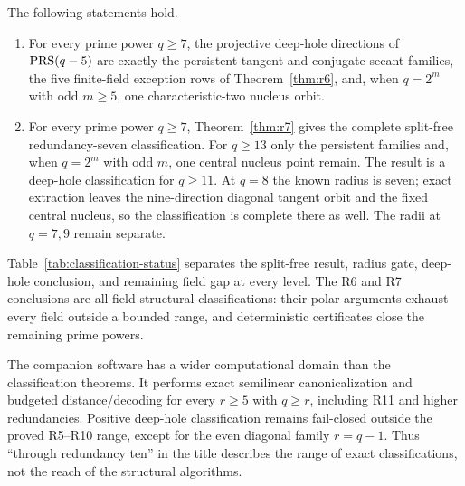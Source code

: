 \begin{theorem}
\label{thm:spine}%
%
%
The following statements hold.
\begin{enumerate}[label=\textup{(\alph*)}]
\item For every prime power $q\geq7$, the projective deep-hole
      directions of $\operatorname{PRS}(q-5)$ are exactly the persistent tangent and
      conjugate-secant families, the five finite-field exception rows of
      Theorem~\ref{thm:r6}, and, when $q=2^m$ with odd $m\geq5$, one
      characteristic-two nucleus orbit.
\item For every prime power $q\geq7$, Theorem~\ref{thm:r7} gives the
      complete split-free redundancy-seven classification.  For $q\geq13$
      only the persistent families and, when $q=2^m$ with odd $m$, one
      central nucleus point remain.  The result is a deep-hole classification
      for $q\geq11$.  At $q=8$ the known radius is seven; exact extraction
      leaves the nine-direction diagonal tangent orbit and the fixed central
      nucleus, so the classification is complete there as well. The radii at
      $q=7,9$ remain separate.
\end{enumerate}
\end{theorem}

Table~\ref{tab:classification-status} separates the split-free result,
radius gate, deep-hole conclusion, and remaining field gap at every level.
The R6 and R7 conclusions are all-field structural classifications: their
polar arguments exhaust every field outside a bounded range, and deterministic
certificates close the remaining prime powers.

The companion software has a wider computational domain than the classification
theorems.  It performs exact semilinear canonicalization and budgeted
distance/decoding for every \(r\geq5\) with \(q\geq r\), including R11 and
higher redundancies.  Positive deep-hole classification remains fail-closed
outside the proved R5--R10 range, except for the even diagonal family
\(r=q-1\).  Thus ``through redundancy ten'' in the title describes the range of
exact classifications, not the reach of the structural algorithms.
